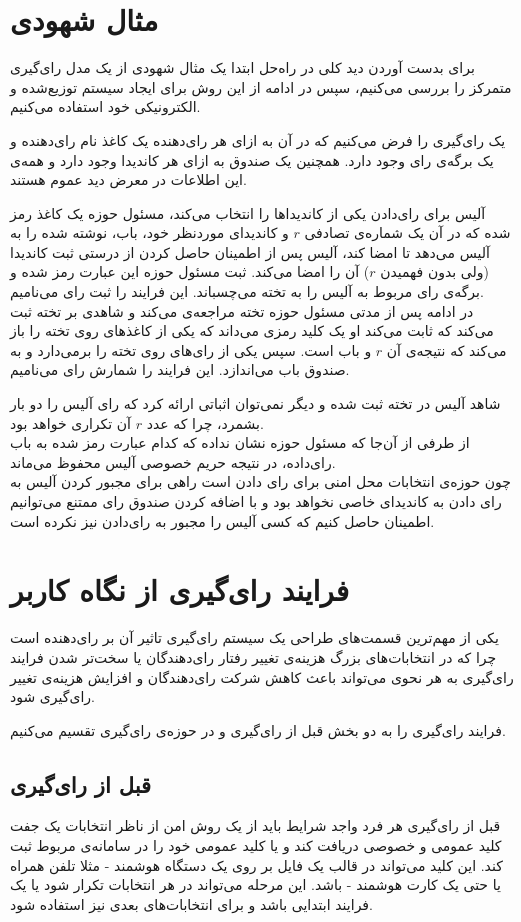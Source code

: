 \section{مثال شهودی}
برای بدست آوردن دید کلی در راه‌حل ابتدا یک مثال شهودی از یک مدل رای‌گیری متمرکز را بررسی می‌کنیم،‌ سپس در ادامه از این روش برای ایجاد سیستم توزیع‌شده و الکترونیکی خود استفاده می‌کنیم.
\par
یک رای‌گیری را فرض می‌کنیم که در آن به ازای هر رای‌دهنده یک کاغذ نام رای‌دهنده و یک برگه‌ی رای وجود دارد. همچنین یک صندوق به ازای هر کاندیدا وجود دارد و همه‌ی این اطلاعات در معرض دید عموم هستند. 
\par
آلیس برای رای‌دادن یکی از کاندیداها را انتخاب می‌کند، مسئول حوزه یک کاغذ رمز شده که در آن یک شماره‌ی تصادفی $r$ و کاندیدای موردنظر خود، باب، نوشته شده را به آلیس می‌دهد تا امضا کند، آلیس پس از اطمینان حاصل کردن از درستی ثبت کاندیدا (ولی بدون فهمیدن $r$) آن را امضا می‌کند. ثبت مسئول حوزه این عبارت رمز شده و برگه‌ی رای مربوط به آلیس را به تخته می‌چسباند. این فرایند را ثبت رای‌ می‌نامیم.
\\
در ادامه پس از مدتی مسئول حوزه تخته مراجعه‌ی می‌کند و شاهدی بر تخته ثبت می‌کند که ثابت می‌کند او یک کلید رمزی می‌داند که یکی از کاغذ‌های روی تخته را باز می‌کند که نتیجه‌ی آن $r$ و باب است. سپس یکی از رای‌های روی تخته را برمی‌دارد و به صندوق باب می‌اندازد. این فرایند را شمارش رای‌ می‌نامیم.
\par
 شاهد آلیس در تخته ثبت شده و دیگر نمی‌توان اثباتی ارائه کرد که رای آلیس را دو بار بشمرد، چرا که عدد $r$ آن تکراری خواهد بود.
\\
از طرفی از آن‌جا که مسئول حوزه نشان نداده که کدام عبارت رمز شده به باب رای‌داده، در نتیجه حریم خصوصی آلیس محفوظ می‌ماند.
\\ 
چون حوزه‌ی انتخابات محل امنی برای رای‌ دادن است راهی برای مجبور کردن آلیس به رای دادن به کاندیدای خاصی نخواهد بود و با اضافه کردن صندوق رای ممتنع می‌توانیم اطمینان حاصل کنیم که کسی آلیس را مجبور به رای‌دادن نیز نکرده است. 

\section{فرایند رای‌گیری از نگاه کاربر}
یکی از مهم‌ترین قسمت‌های طراحی یک سیستم رای‌گیری تاثیر آن بر رای‌دهنده است چرا که در انتخابات‌های بزرگ هزینه‌ی تغییر رفتار رای‌دهندگان یا سخت‌تر شدن فرایند رای‌گیری به هر نحوی می‌تواند باعث کاهش شرکت رای‌دهندگان و افزایش هزینه‌ی تغییر رای‌گیری شود.
\par
فرایند رای‌گیری را به دو بخش قبل از رای‌گیری و در حوزه‌ی رای‌گیری تقسیم می‌کنیم. 
\subsection{قبل از رای‌گیری}
قبل از رای‌گیری هر فرد واجد شرایط باید از یک روش امن از ناظر انتخابات یک جفت کلید عمومی و خصوصی دریافت کند و یا کلید عمومی خود را در سامانه‌ی مربوط ثبت کند. این کلید می‌تواند در قالب یک فایل بر روی یک دستگاه هوشمند - مثلا تلفن همراه یا حتی یک کارت هوشمند - باشد. این مرحله  می‌تواند در هر انتخابات تکرار شود یا یک فرایند ابتدایی باشد و برای انتخابات‌های بعدی نیز استفاده شود. 
